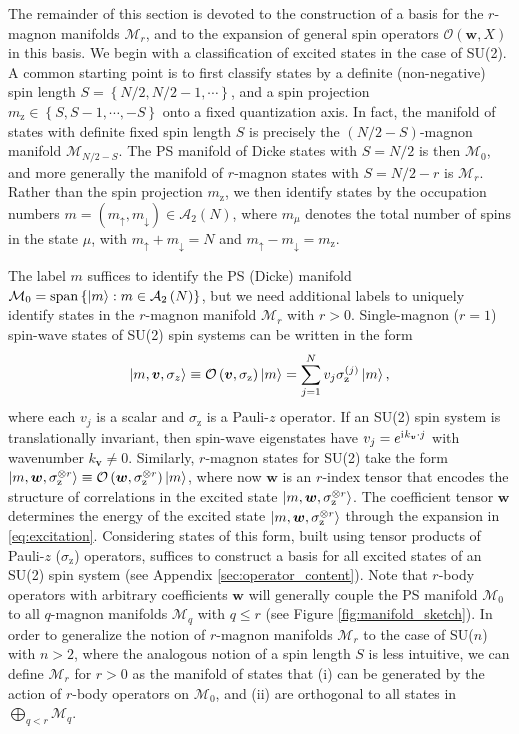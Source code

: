 \documentclass[nofootinbib,notitlepage,11pt]{revtex4-2}
\newcommand{\p}[1]{\left(#1\right)} %
\renewcommand{\set}[1]{\left\{#1\right\}} %
\renewcommand{\c}{\cdot} %
\newcommand{\m}{\bm} %
\newcommand{\1}{\mathds{1}}
\newcommand{\up}{\uparrow}
\newcommand{\dn}{\downarrow}
\renewcommand{\i}{\mathrm{i}\mkern1mu}
\newcommand{\z}{\text{z}}
\newcommand{\A}{\mathcal{A}}
\newcommand{\M}{\mathcal{M}}
\renewcommand{\O}{\mathcal{O}}
\newcommand{\oper}{\operatorname}
\begin{document}
The remainder of this section is devoted to the construction of a
basis for the $r$-magnon manifolds $\M_r$, and to the expansion of
general spin operators $\O\p{\m w,X}$ in this basis.  We begin with a
classification of excited states in the case of SU(2).  A common
starting point is to first classify states by a definite
(non-negative) spin length $S=\set{N/2,N/2-1,\cdots}$, and a spin
projection $m_\z\in\set{S,S-1,\cdots,-S}$ onto a fixed quantization
axis.  In fact, the manifold of states with definite fixed spin length
$S$ is precisely the $\p{N/2-S}$-magnon manifold $\M_{N/2-S}$.  The PS
manifold of Dicke states with $S=N/2$ is then $\M_0$, and more
generally the manifold of $r$-magnon states with $S=N/2-r$ is $\M_r$.
Rather than the spin projection $m_\z$, we then identify states by the
occupation numbers $m=\p{m_\up,m_\dn}\in\A_2\p{N}$, where $m_\mu$
denotes the total number of spins in the state $\mu$, with
$m_\up+m_\dn=N$ and $m_\up-m_\dn=m_\z$.

The label $m$ suffices to identify the PS (Dicke) manifold
$\M_0=\oper{span}\set{\ket{m}:m\in\A_2\p{N}}$, but we need additional
labels to uniquely identify states in the $r$-magnon manifold $\M_r$
with $r>0$.  Single-magnon ($r=1$) spin-wave states of SU(2) spin
systems can be written in the form
\begin{align}
  \ket{m,\m v,\sigma_z}
  \equiv \O\p{\m v,\sigma_\z} \ket{m}
  = \sum_{j=1}^N v_j \sigma_\z^{(j)} \ket{m},
\end{align}
where each $v_j$ is a scalar and $\sigma_\z$ is a Pauli-$z$ operator.
If an SU(2) spin system is translationally invariant, then spin-wave
eigenstates have $v_j=e^{\i k_{\m v}\c j}$ with wavenumber
$k_{\m v}\ne0$.  Similarly, $r$-magnon states for SU(2) take the form
$\ket{m,\m w,\sigma_\z^{\otimes r}} \equiv \O\p{\m
  w,\sigma_\z^{\otimes r}}\ket{m}$, where now $\m w$ is an $r$-index
tensor that encodes the structure of correlations in the excited state
$\ket{m,\m w,\sigma_\z^{\otimes r}}$.  The coefficient tensor $\m w$
determines the energy of the excited state
$\ket{m,\m w,\sigma_\z^{\otimes r}}$ through the expansion in
\eqref{eq:excitation}.  Considering states of this form, built using
tensor products of Pauli-$z$ ($\sigma_\z$) operators, suffices to
construct a basis for all excited states of an SU(2) spin system (see
Appendix \ref{sec:operator_content}).  Note that $r$-body operators
with arbitrary coefficients $\m w$ will generally couple the PS
manifold $\M_0$ to all $q$-magnon manifolds $\M_q$ with $q\le r$ (see
Figure \ref{fig:manifold_sketch}).  In order to generalize the notion
of $r$-magnon manifolds $\M_r$ to the case of SU($n$) with $n>2$,
where the analogous notion of a spin length $S$ is less intuitive, we
can define $\M_r$ for $r>0$ as the manifold of states that (i) can be
generated by the action of $r$-body operators on $\M_0$, and (ii) are
orthogonal to all states in $\bigoplus_{q<r}\M_q$.
\end{document}

